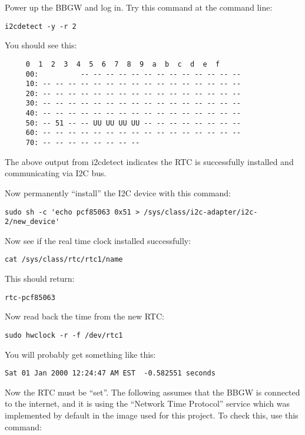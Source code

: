 Power up the BBGW and log in.  Try this command at the command line:

\begin{verbatim}
i2cdetect -y -r 2
\end{verbatim}

You should see this:

\begin{verbatim}
     0  1  2  3  4  5  6  7  8  9  a  b  c  d  e  f
     00:          -- -- -- -- -- -- -- -- -- -- -- -- -- 
     10: -- -- -- -- -- -- -- -- -- -- -- -- -- -- -- -- 
     20: -- -- -- -- -- -- -- -- -- -- -- -- -- -- -- -- 
     30: -- -- -- -- -- -- -- -- -- -- -- -- -- -- -- -- 
     40: -- -- -- -- -- -- -- -- -- -- -- -- -- -- -- -- 
     50: -- 51 -- -- UU UU UU UU -- -- -- -- -- -- -- -- 
     60: -- -- -- -- -- -- -- -- -- -- -- -- -- -- -- -- 
     70: -- -- -- -- -- -- -- --
\end{verbatim}

The above output from i2cdetect indicates the RTC is successfully installed and communicating via I2C bus.

Now permanently ``install'' the I2C device with this command:

\begin{verbatim}
sudo sh -c 'echo pcf85063 0x51 > /sys/class/i2c-adapter/i2c-2/new_device'
\end{verbatim}

Now see if the real time clock installed successfully:

\begin{verbatim}
cat /sys/class/rtc/rtc1/name
\end{verbatim}

This should return:

\begin{verbatim}
rtc-pcf85063
\end{verbatim}

Now read back the time from the new RTC:

\begin{verbatim}
sudo hwclock -r -f /dev/rtc1
\end{verbatim}

You will probably get something like this:

\begin{verbatim}
Sat 01 Jan 2000 12:24:47 AM EST  -0.582551 seconds
\end{verbatim}

Now the RTC must be ``set''.  The following assumes that the BBGW is connected to the internet, and it is using the ``Network Time Protocol'' service which was implemented by default in the image used for this project.
To check this, use this command:

